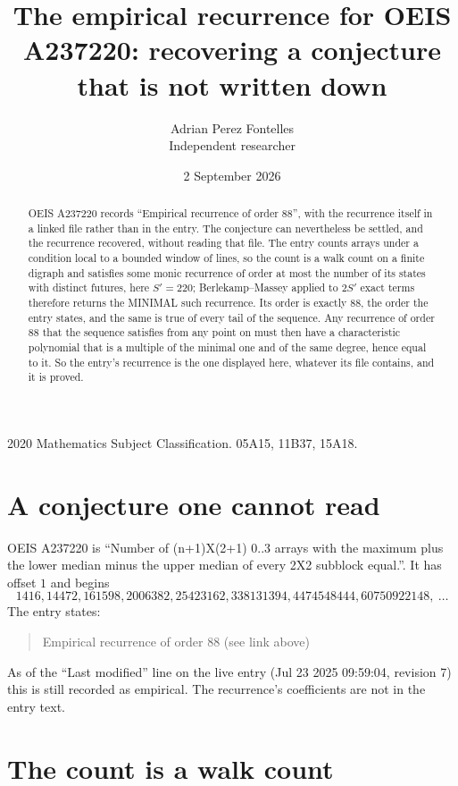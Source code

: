 \documentclass[11pt,a4paper]{article}
\title{The empirical recurrence for OEIS A237220: recovering a conjecture that is not written down}
\author{Adrian Perez Fontelles\\ \small Independent researcher}
\date{2 September 2026}
\theoremstyle{plain}
\theoremstyle{definition}
\begin{document}
\maketitle

\begin{abstract}
OEIS A237220 records ``Empirical recurrence of order $88$'', with the recurrence itself in a
linked file rather than in the entry. The conjecture can nevertheless be settled, and the
recurrence recovered, without reading that file. The entry counts arrays under a condition
local to a bounded window of lines, so the count is a walk count on a finite digraph and
satisfies some monic recurrence of order at most the number of its states with distinct
futures, here $S'=220$; Berlekamp--Massey applied to $2S'$ exact
terms therefore returns the MINIMAL such recurrence. Its order is exactly $88$, the order
the entry states, and the same is true of every tail of the sequence. Any recurrence of order
$88$ that the sequence satisfies from any point on must then have a characteristic
polynomial that is a multiple of the minimal one and of the same degree, hence equal to it. So
the entry's recurrence is the one displayed here, whatever its file contains, and it is
proved.
\end{abstract}

\noindent\small 2020 Mathematics Subject Classification. 05A15, 11B37, 15A18.\normalsize

\section{A conjecture one cannot read}

OEIS A237220 is ``Number of (n+1)X(2+1) 0..3 arrays with the maximum plus the lower median minus the upper median of every 2X2 subblock equal.''. It has offset $1$ and begins
\[
1416, 14472, 161598, 2006382, 25423162, 338131394, 4474548444, 60750922148,\ \dots
\]
The entry states:
\begin{quote}
Empirical recurrence of order 88 (see link above)
\end{quote}
As of the ``Last modified'' line on the live entry (Jul 23 2025 09:59:04, revision 7) this is still
recorded as empirical. The recurrence's coefficients are not in the entry text.

\section{The count is a walk count}
\end{document}
